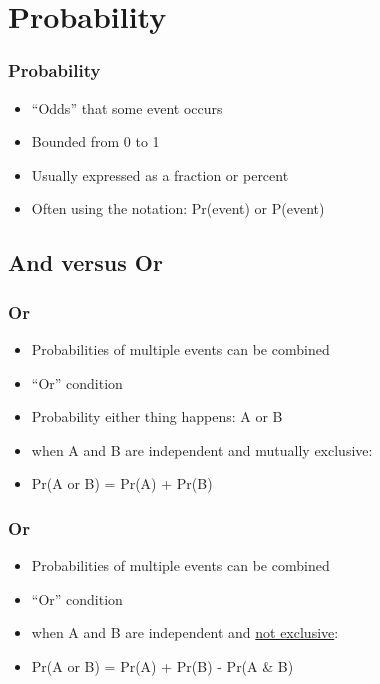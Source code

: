 \documentclass[14pt,handout]{beamer}
\begin{document}
\section{Probability}

\begin{frame}
\frametitle{Probability}
\begin{itemize}
	\item<+-> ``Odds'' that some event occurs
	\item<+-> Bounded from 0 to 1
	\item<+-> Usually expressed as a fraction or percent
	\item<+-> Often using the notation: Pr(event) or P(event)
\end{itemize}
\end{frame}

\subsection{And versus Or}

\begin{frame}
\frametitle{Or}
\begin{itemize}
	\item<+-> Probabilities of multiple events can be combined
	\item<+-> ``Or'' condition
	\item<+-> Probability either thing happens: A or B
	\item<+-> when A and B are independent and mutually exclusive:
	\item<+-> Pr(A or B) = Pr(A) + Pr(B)
\end{itemize}
\end{frame}

\begin{frame}
\frametitle{Or}
\begin{itemize}
	\item<+-> Probabilities of multiple events can be combined
	\item<+-> ``Or'' condition
	\item<+-> when A and B are independent and \underline{not exclusive}:
	\item<+-> Pr(A or B) = Pr(A) + Pr(B) - Pr(A \& B)
\end{itemize}
\end{frame}
\end{document}

